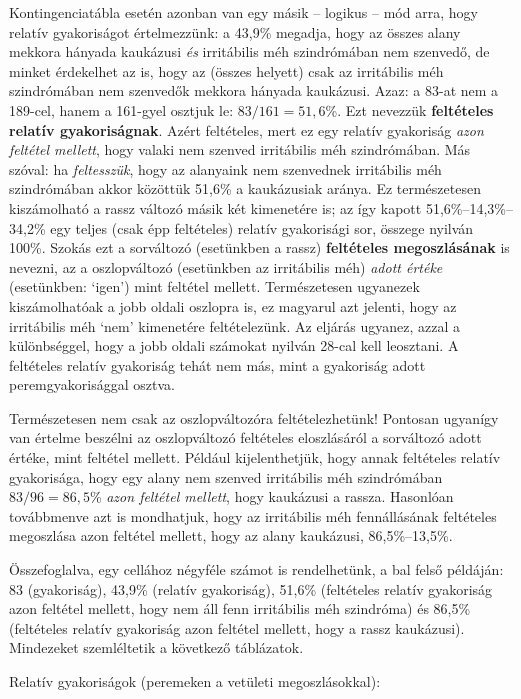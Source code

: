 \documentclass[]{book}
\begin{document}
Kontingenciatábla esetén azonban van egy másik -- logikus -- mód arra,
hogy relatív gyakoriságot értelmezzünk: a 43,9\% megadja, hogy az összes
alany mekkora hányada kaukázusi \emph{és} irritábilis méh szindrómában
nem szenvedő, de minket érdekelhet az is, hogy az (összes helyett) csak
az irritábilis méh szindrómában nem szenvedők mekkora hányada kaukázusi.
Azaz: a 83-at nem a 189-cel, hanem a 161-gyel osztjuk le:
\(83/161=51,\!6\)\%. Ezt nevezzük \textbf{feltételes relatív
gyakoriságnak}. Azért feltételes, mert ez egy relatív gyakoriság
\emph{azon feltétel mellett}, hogy valaki nem szenved irritábilis méh
szindrómában. Más szóval: ha \emph{feltesszük}, hogy az alanyaink nem
szenvednek irritábilis méh szindrómában akkor közöttük 51,6\% a
kaukázusiak aránya. Ez természetesen kiszámolható a rassz változó másik
két kimenetére is; az így kapott 51,6\%--14,3\%--34,2\% egy teljes (csak
épp feltételes) relatív gyakorisági sor, összege nyilván 100\%. Szokás
ezt a sorváltozó (esetünkben a rassz) \textbf{feltételes megoszlásának}
is nevezni, az a oszlopváltozó (esetünkben az irritábilis méh)
\emph{adott értéke} (esetünkben: `igen') mint feltétel mellett.
Természetesen ugyanezek kiszámolhatóak a jobb oldali oszlopra is, ez
magyarul azt jelenti, hogy az irritábilis méh `nem' kimenetére
feltételezünk. Az eljárás ugyanez, azzal a különbséggel, hogy a jobb
oldali számokat nyilván 28-cal kell leosztani. A feltételes relatív
gyakoriság tehát nem más, mint a gyakoriság adott peremgyakorisággal
osztva.

Természetesen nem csak az oszlopváltozóra feltételezhetünk! Pontosan
ugyanígy van értelme beszélni az oszlopváltozó feltételes eloszlásáról a
sorváltozó adott értéke, mint feltétel mellett. Például kijelenthetjük,
hogy annak feltételes relatív gyakorisága, hogy egy alany nem szenved
irritábilis méh szindrómában \(83/96=86,\!5\)\% \emph{azon feltétel
mellett}, hogy kaukázusi a rassza. Hasonlóan továbbmenve azt is
mondhatjuk, hogy az irritábilis méh fennállásának feltételes megoszlása
azon feltétel mellett, hogy az alany kaukázusi, 86,5\%--13,5\%.

Összefoglalva, egy cellához négyféle számot is rendelhetünk, a bal felső
példáján: 83 (gyakoriság), 43,9\% (relatív gyakoriság), 51,6\%
(feltételes relatív gyakoriság azon feltétel mellett, hogy nem áll fenn
irritábilis méh szindróma) és 86,5\% (feltételes relatív gyakoriság azon
feltétel mellett, hogy a rassz kaukázusi). Mindezeket szemléltetik a
következő táblázatok.

Relatív gyakoriságok (peremeken a vetületi megoszlásokkal):
\end{document}
